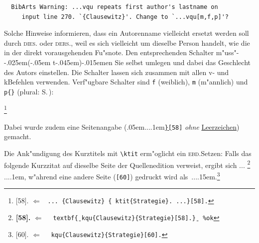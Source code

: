 \documentclass[12pt,a4paper]{article}
\newcommand{\pbs}{\string\ \unskip}
\newcommand{\bs}{\protect\pbs}
\begin{document}
  \vspace{-.75ex}
  {\footnotesize\begin{verbatim}
  BibArts Warning: ...vqu repeats first author's lastname on
     input line 270. `{Clausewitz}'. Change to `...vqu[m,f,p]'?
  \end{verbatim}}

 \vspace{-3.25ex}\noindent 
 Solche Hinweise informieren, dass ein Autorenname
 vielleicht ersetzt werden soll durch \textsc{dies.} oder \textsc{ders.},
 weil es sich vielleicht um dieselbe Person handelt, wie 
 die in der direkt vorausgehenden Fu"snote. 
 Den entsprechenden Schalter m"uss"-\kern-.025em(\kern-.05em t\kern-.045em)\kern-.015emen Sie
 selbst umlegen und dabei das Geschlecht des Autors einstellen. 
 Die Schalter lassen sich zusammen mit allen v- und k\fhy Befehlen 
 verwenden. Verf"ugbare Schalter sind\hspace{.1em}
 \verb|f| (weiblich),\hspace{.1em} \verb|m| (m"annlich) und\hspace{.1em} \verb|p{}|
 (plural: S.\,\pageref{p}):

{\renewcommand{\thefootnote}{{\bfseries\arabic{footnote}}}%
 \footnote{[58].
 \hspace{.8em} $\Leftarrow$ \ \texttt{... \{Clausewitz\} \{\bs ktit\{Strategie\}. ...\}[58].}}%
}

\vspace{1.ex}\noindent 
Dabei wurde zudem eine Seitenangabe (\kern.05em...\kern.1em\texttt{\underline{\}[}58]}
\textit{ohne} \underline{Leerzeichen}) gemacht. 

Die Ank"undigung des
Kurztitels mit \hspace{-.1em}\verb|\ktit| erm"oglicht ein \textsc{ebd.}\hy Setzen:
Falls das folgende Kurzzitat auf 
dieselbe Seite der Quellenedition verweist, ergibt sich ...%
{\renewcommand{\thefootnote}{{\bfseries\itshape\arabic{footnote}}}%
 \footnote{\textbf{[58].}\label{ErsterFall} 
 \hspace{5.7em} $\Leftarrow$ \ \texttt{\bs textbf\b{\{}\bs kqu\{Clausewitz\}\{Strategie\}[58].\b{\}}
\texttt{ \%ok}}}
} \hspace{-.1em}...\kern.1em, w"ahrend eine andere Seite (\verb|[60]|) gedruckt wird 
als~...\kern.15em.\footnote{[60]. 
\hspace{3.05em} $\Leftarrow$ \ \texttt{\bs kqu\{Clausewitz\}\{Strategie\}[60].}}
\end{document}
